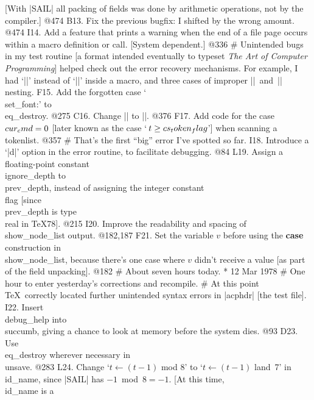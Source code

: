 	[With |SAIL| all packing of fields was done by arithmetic operations,
	not by the compiler.] @474
B13. Fix the previous bugfix: I shifted by the wrong amount. @474
I14. Add a feature that prints a warning when the end of a file page occurs within
	a macro definition or call. [System dependent.] @336
# Unintended bugs in my test routine [a format intended eventually to typeset
	{\sl The Art of Computer Programming\/}] helped check out the
	error recovery mechanisms.
	For example, I had `|\lft{#}|' instead of `|\lft{##}|' inside a macro,
	and three cases of improper |{|~and~|}| nesting.
F15. Add the forgotten case `\\{set_font}:' to \\{eq_destroy}. @275
C16. Change |\require| to ||. @376
F17. Add code for the case $\\{cur_cmd}=0$ [later known as the case
	`$\,t\ge\\{cs_token_flag}$'] when scanning a tokenlist. @357
# That's the first ``big'' error I've spotted so far.
I18. Introduce a `|d|' option in the error routine, to facilitate debugging. @84
L19. Assign a floating-point constant \\{ignore_depth} to \\{prev_depth},
	instead of assigning the integer constant \\{flag}
	[since \\{prev_depth} is type \\{real} in \TeX78]. @215
I20. Improve the readability and spacing of \\{show_node_list} output. @182,187
F21. Set the variable $v$ before using the {\bf case} construction in
	\\{show_node_list}, because there's one case where $v$ 
	didn't receive a value [as part of the field unpacking]. @182
# About seven hours today.
* 12 Mar 1978
# One hour to enter yesterday's corrections and recompile.
# At this point \TeX\ correctly located further unintended syntax errors
	in |acphdr| [the test file].
I22. Insert \\{debug_help} into \\{succumb}, giving a chance to look at memory
	before the system dies. @93
D23. Use \\{eq_destroy} wherever necessary in \\{unsave}. @283
L24. Change `$t \gets  (t-1)$ mod 8' to `$t \gets  (t-1)$ land~7' in \\{id_name},
	since |SAIL| has $-1$~mod~$8 = -1$. [At this time, \\{id_name} is a
